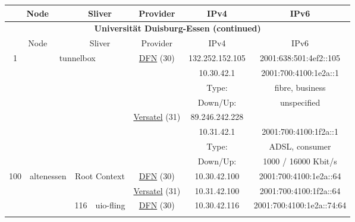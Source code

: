 \begin{small}
\begin{center}
\begin{longtable}{|c|c|c|c|c|c|c|c|}
 \multicolumn{2}{|p{8em}|}{Node} & \multicolumn{2}{|p{8em}|}{Sliver} & \multicolumn{2}{|p{8em}|}{Provider} & IPv4 & IPv6 \\ \hline
\endfirsthead
\hline
 \multicolumn{8}{|c|}{\textbf{Universität Duisburg-Essen (continued)}} \\ \hline
 \multicolumn{2}{|p{8em}|}{Node} & \multicolumn{2}{|p{8em}|}{Sliver} & \multicolumn{2}{|p{8em}|}{Provider} & IPv4 & IPv6 \\ \hline
\endhead
 \multirow{8}{*}{\tiny{1}} & \multicolumn{3}{|c|}{\multirow{8}{*}{\tiny{tunnelbox}}} & \multicolumn{2}{|c|}{\multirow{4}{*}{\tiny{\href{https://www.dfn.de}{DFN} (30)}}} & \tiny{132.252.152.105} & \tiny{2001:638:501:4ef2::105} \\* \cline{7-7}\cline{8-8}
  & \multicolumn{3}{|c|}{} & \multicolumn{2}{|c|}{} & \tiny{10.30.42.1} & \tiny{2001:700:4100:1e2a::1} \\* \cline{7-7}\cline{8-8}
  & \multicolumn{3}{|c|}{} & \multicolumn{2}{|c|}{} & Type: & fibre, business \\* \cline{7-7}\cline{8-8}
  & \multicolumn{3}{|c|}{} & \multicolumn{2}{|c|}{} & Down/Up:  & unspecified \\* \cline{5-5}\cline{6-6}\cline{7-7}\cline{8-8}
  & \multicolumn{3}{|c|}{} & \multicolumn{2}{|c|}{\multirow{4}{*}{\tiny{\href{http://www.versatel.de}{Versatel} (31)}}} & \tiny{89.246.242.228} & \frownie{} \\* \cline{7-7}\cline{8-8}
  & \multicolumn{3}{|c|}{} & \multicolumn{2}{|c|}{} & \tiny{10.31.42.1} & \tiny{2001:700:4100:1f2a::1} \\* \cline{7-7}\cline{8-8}
  & \multicolumn{3}{|c|}{} & \multicolumn{2}{|c|}{} & Type: & ADSL, consumer \\* \cline{7-7}\cline{8-8}
  & \multicolumn{3}{|c|}{} & \multicolumn{2}{|c|}{} & Down/Up:  & 1000 / 16000 Kbit/s \\ \hline
 \multirow{50}{*}{\tiny{100}} & \multicolumn{1}{|l|}{\multirow{50}{*}{\tiny{altenessen}}} & \multicolumn{2}{|c|}{\multirow{2}{*}{\tiny{Root Context}}} & \multicolumn{2}{|c|}{\tiny{\href{https://www.dfn.de}{DFN} (30)}} & \tiny{10.30.42.100} & \tiny{2001:700:4100:1e2a::64} \\* \cline{5-5}\cline{6-6}\cline{7-7}\cline{8-8}
  &  & \multicolumn{2}{|c|}{} & \multicolumn{2}{|c|}{\tiny{\href{http://www.versatel.de}{Versatel} (31)}} & \tiny{10.31.42.100} & \tiny{2001:700:4100:1f2a::64} \\* \cline{3-3}\cline{4-4}\cline{5-5}\cline{6-6}\cline{7-7}\cline{8-8}
  &  & \multirow{2}{*}{\tiny{116}} & \multicolumn{1}{|l|}{\multirow{2}{*}{\tiny{uio-fling}}} & \multicolumn{2}{|c|}{\tiny{\href{https://www.dfn.de}{DFN} (30)}} & \tiny{10.30.42.116} & \tiny{2001:700:4100:1e2a::74:64} \\* \cline{5-5}\cline{6-6}\cline{7-7}\cline{8-8}

\end{longtable}
\end{center}
\end{small}
